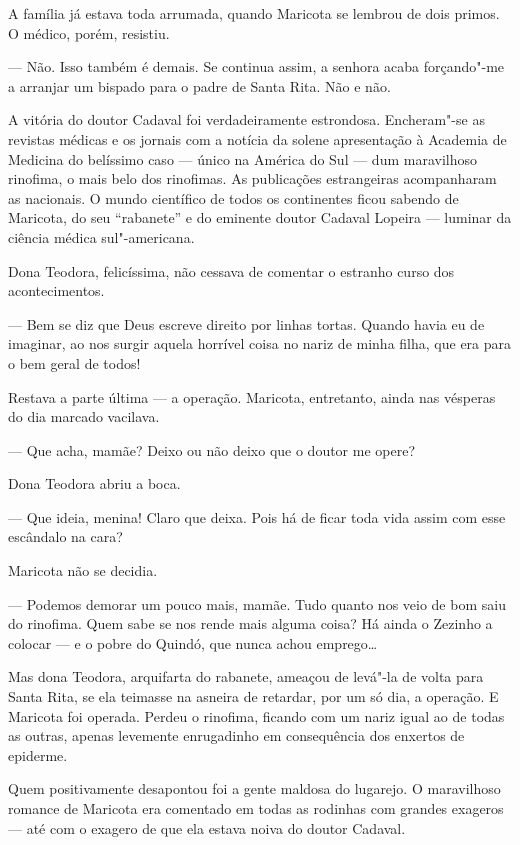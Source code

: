 A família já estava toda arrumada, quando Maricota se lembrou de dois
primos. O médico, porém, resistiu.

--- Não. Isso também é demais. Se continua assim, a senhora acaba
forçando"-me a arranjar um bispado para o padre de Santa Rita. Não e não.

A vitória do doutor Cadaval foi verdadeiramente estrondosa. Encheram"-se
as revistas médicas e os jornais com a notícia da solene apresentação à
Academia de Medicina do belíssimo caso --- único na América do Sul ---
dum maravilhoso rinofima, o mais belo dos rinofimas. As publicações
estrangeiras acompanharam as nacionais. O mundo científico de todos os
continentes ficou sabendo de Maricota, do seu ``rabanete'' e do eminente
doutor Cadaval Lopeira --- luminar da ciência médica sul"-americana.

Dona Teodora, felicíssima, não cessava de comentar o estranho curso dos
acontecimentos.

--- Bem se diz que Deus escreve direito por linhas tortas. Quando havia
eu de imaginar, ao nos surgir aquela horrível coisa no nariz de minha
filha, que era para o bem geral de todos!

Restava a parte última --- a operação. Maricota, entretanto, ainda nas
vésperas do dia marcado vacilava.

--- Que acha, mamãe? Deixo ou não deixo que o doutor me opere?

Dona Teodora abriu a boca.

--- Que ideia, menina! Claro que deixa. Pois há de ficar toda vida assim
com esse escândalo na cara?

Maricota não se decidia.

--- Podemos demorar um pouco mais, mamãe. Tudo quanto nos veio de bom
saiu do rinofima. Quem sabe se nos rende mais alguma coisa? Há ainda o
Zezinho a colocar --- e o pobre do Quindó, que nunca achou emprego\ldots{}

Mas dona Teodora, arquifarta do rabanete, ameaçou de levá"-la de volta
para Santa Rita, se ela teimasse na asneira de retardar, por um só dia,
a operação. E Maricota foi operada. Perdeu o rinofima, ficando com um
nariz igual ao de todas as outras, apenas levemente enrugadinho em
consequência dos enxertos de epiderme.

Quem positivamente desapontou foi a gente maldosa do lugarejo. O
maravilhoso romance de Maricota era comentado em todas as rodinhas com
grandes exageros --- até com o exagero de que ela estava noiva do doutor
Cadaval.

